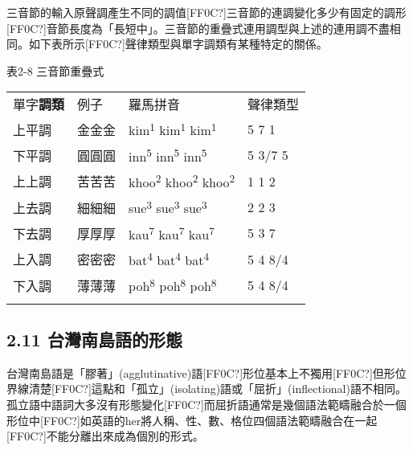 \textrm{三音節的輸入原聲調產生不同的調值[FF0C?]三音節的連調變化多少有固定的調形[FF0C?]音節長度為「長短中」。三音節的重疊式連用調型與上述的連用調不盡相同。如下表所示[FF0C?]聲律類型與單字調類有某種特定的關係。}

\rmfamily
表2-8 三音節重疊式

\tablefirsthead{}

\tabletail{}
\tablelasttail{}
\begin{tabularx}{\textwidth}{XXXX}
\lsptoprule

{\sffamily \textrm{單字}\textrm{\textbf{調類}}} & 例子 & 羅馬拼音 & 聲律類型\\
 上平調 & 金金金 & {\sffamily \textrm{kim}\textrm{\textsuperscript{1} }\textrm{kim}\textrm{\textsuperscript{1}} \textrm{kim}\textrm{\textsuperscript{1}}} & 5 7 1\\
 下平調 & 圓圓圓 & {\sffamily \textrm{inn}\textrm{\textsuperscript{5}} \textrm{inn}\textrm{\textsuperscript{5}} \textrm{inn}\textrm{\textsuperscript{5}}} & 5 3/7 5\\
 上上調 & 苦苦苦 & {\sffamily \textrm{khoo}\textrm{\textsuperscript{2}} \textrm{khoo}\textrm{\textsuperscript{2}} \textrm{khoo}\textrm{\textsuperscript{2}}} & 1 1 2\\
 上去調 & 細細細 & {\sffamily \textrm{sue}\textrm{\textsuperscript{3}} \textrm{sue}\textrm{\textsuperscript{3}} \textrm{sue}\textrm{\textsuperscript{3}}} & 2 2 3\\
 下去調 & 厚厚厚 & {\sffamily \textrm{kau}\textrm{\textsuperscript{7}} \textrm{kau}\textrm{\textsuperscript{7}} \textrm{kau}\textrm{\textsuperscript{7}}} & 5 3 7\\
 上入調 & 密密密 & {\sffamily \textrm{bat}\textrm{\textsuperscript{4}} \textrm{bat}\textrm{\textsuperscript{4}} \textrm{bat}\textrm{\textsuperscript{4}}} & 5 4 8/4\\
 下入調 & 薄薄薄 & {\sffamily \textrm{poh}\textrm{\textsuperscript{8}} \textrm{poh}\textrm{\textsuperscript{8}} \textrm{poh}\textrm{\textsuperscript{8}}} & 5 4 8/4\\
\lspbottomrule
\end{tabularx}
\subsection{\textrm{2.11 台灣南島語的形態}}
\begin{styleii}
台灣南島語是「膠著」(agglutinative)語\textsf{[FF0C?]}形位基本上不獨用\textsf{[FF0C?]}但形位界線清楚\textsf{[FF0C?]}這點和「孤立」(isolating)語或「屈折」(inflectional)語不相同\textsf{。}孤立語中語詞大多沒有形態變化\textsf{[FF0C?]}而屈折語通常是幾個語法範疇融合於一個形位中\textsf{[FF0C?]}如英語的her將人稱\textsf{、}性\textsf{、}數\textsf{、}格位四個語法範疇融合在一起\textsf{[FF0C?]}不能分離出來成為個別的形式\textsf{。}
\end{styleii}

